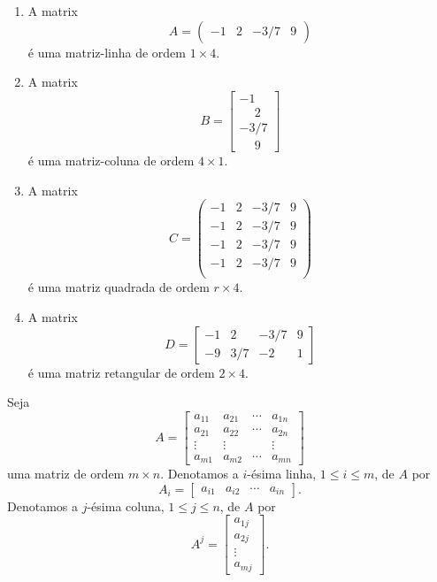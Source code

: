 \begin{exemplo}
	\begin{enumerate}
		\item A matrix
		\[
			A = \begin{pmatrix}
				-1 & 2 & -3/7 & 9
			\end{pmatrix}
		\]
		é uma matriz-linha de ordem $1 \times 4$.
		\item A matrix
		\[
			B = \begin{bmatrix}
				-1 \\ \phantom{-}2 \\ -3/7 \\ \phantom{-}9
			\end{bmatrix}
		\]
		é uma matriz-coluna de ordem $4 \times 1$.
		\item A matrix
		\[
			C = \begin{pmatrix}
				-1 & 2 & -3/7 & 9\\
				-1 & 2 & -3/7 & 9\\
				-1 & 2 & -3/7 & 9\\
				-1 & 2 & -3/7 & 9\\
			\end{pmatrix}
		\]
		é uma matriz quadrada de ordem $r \times 4$.
		\item A matrix
		\[
			D = \begin{bmatrix}
				-1 & 2 & -3/7 & 9\\
				-9 & 3/7 & -2 & 1
			\end{bmatrix}
		\]
		é uma matriz retangular de ordem $2 \times 4$.
	\end{enumerate}
\end{exemplo}

Seja
\[
	A = \begin{bmatrix}
		a_{11} & a_{21} & \cdots & a_{1n}\\
		a_{21} & a_{22} & \cdots & a_{2n}\\
		\vdots & \vdots & & \vdots\\
		a_{m1} & a_{m2} & \cdots & a_{mn}
	\end{bmatrix}
\]
uma matriz de ordem $m \times n$. Denotamos a $i$-ésima linha, $1 \le i \le m$, de $A$ por
\[
	A_i = \begin{bmatrix}a_{i1} & a_{i2} & \cdots & a_{in}\end{bmatrix}.
\]
Denotamos a $j$-ésima coluna, $1 \le j \le n$, de $A$ por
\[
	A^j = \begin{bmatrix}a_{1j} \\ a_{2j} \\ \vdots \\ a_{mj}\end{bmatrix}.
\]

